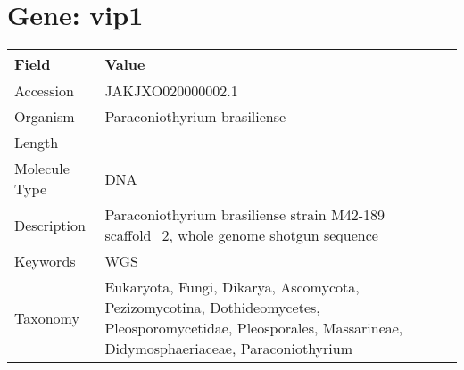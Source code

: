 \documentclass[10pt]{article}
\begin{document}
\section*{Gene: vip1}
{\footnotesize
\begin{longtable}{>{\raggedright\arraybackslash}p{4.5cm} >{\raggedright\arraybackslash}p{11.5cm}}
\textbf{Field} & \textbf{Value} \\
\hline
Accession & JAKJXO020000002.1 \\
Organism & Paraconiothyrium brasiliense \\
Length & 3244158 \\
Molecule Type & DNA \\
Description & Paraconiothyrium brasiliense strain M42-189 scaffold\_2, whole genome shotgun sequence \\
Keywords & WGS \\
Taxonomy & Eukaryota, Fungi, Dikarya, Ascomycota, Pezizomycotina, Dothideomycetes, Pleosporomycetidae, Pleosporales, Massarineae, Didymosphaeriaceae, Paraconiothyrium \\
\end{longtable}
}
\end{document}
